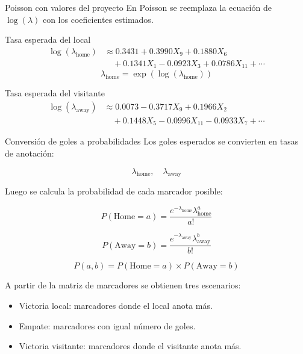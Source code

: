 \documentclass[aspectratio=169]{beamer}
\begin{document}
\begin{frame}[t]{Poisson con valores del proyecto}
\scriptsize
\justifying
En Poisson se reemplaza la ecuación de $\log(\lambda)$ con los coeficientes estimados.

\vspace{0.1cm}
\begin{block}{Tasa esperada del local}
\[
\begin{aligned}
\log(\lambda_{\text{home}})
&\approx
0.3431+0.3990X_9+0.1880X_6\\
&\quad +0.1341X_1-0.0923X_3+0.0786X_{11}+\cdots
\end{aligned}
\]
\[
\lambda_{\text{home}}=\exp(\log(\lambda_{\text{home}}))
\]
\end{block}

\begin{block}{Tasa esperada del visitante}
\[
\begin{aligned}
\log(\lambda_{\text{away}})
&\approx
0.0073-0.3717X_9+0.1966X_2\\
&\quad +0.1448X_5-0.0996X_{11}-0.0933X_7+\cdots
\end{aligned}
\]
\end{block}
\end{frame}

\begin{frame}{Conversión de goles a probabilidades}
\justifying
Los goles esperados se convierten en tasas de anotación:

\[
\lambda_{\text{home}}, \quad \lambda_{\text{away}}
\]

Luego se calcula la probabilidad de cada marcador posible:

\[
P(\text{Home}=a)=
\frac{e^{-\lambda_{\text{home}}}\lambda_{\text{home}}^a}{a!}
\]

\[
P(\text{Away}=b)=
\frac{e^{-\lambda_{\text{away}}}\lambda_{\text{away}}^b}{b!}
\]

\[
P(a,b)=P(\text{Home}=a)\times P(\text{Away}=b)
\]

\vspace{0.2cm}
A partir de la matriz de marcadores se obtienen tres escenarios:

\begin{itemize}
    \item Victoria local: marcadores donde el local anota más.
    \item Empate: marcadores con igual número de goles.
    \item Victoria visitante: marcadores donde el visitante anota más.
\end{itemize}
\end{frame}
\end{document}
